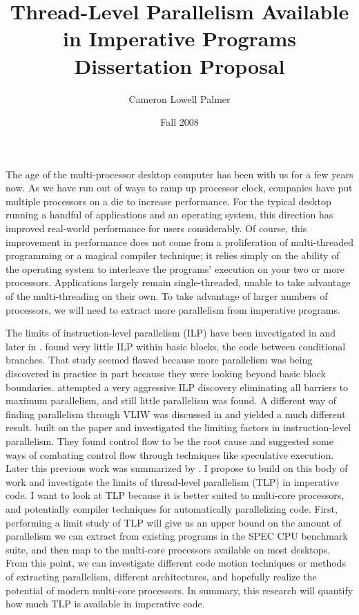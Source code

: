 \documentclass[12pt,twoside,letterpaper]{article}
\title{Thread-Level Parallelism Available in Imperative Programs Dissertation Proposal}
\author{Cameron Lowell Palmer}
\date{Fall 2008}
\begin{document}
\maketitle
The age of the multi-processor desktop computer has been with us for a few years now. As we have run out of ways to ramp up processor clock, companies have put multiple processors on a die to increase performance. For the typical desktop running a handful of applications and an operating system, this direction has improved real-world performance for users considerably. Of course, this improvement in performance does not come from a proliferation of multi-threaded programming or a magical compiler technique; it relies simply on the ability of the operating system to interleave the programs' execution on your two or more processors. Applications largely remain single-threaded, unable to take advantage of the multi-threading on their own. To take advantage of larger numbers of processors, we will need to extract more parallelism from imperative programs.

The limits of instruction-level parallelism (ILP) have been investigated in \cite{Tjaden:1970p214} and later in \cite{Wall:1991p191}. \cite{Tjaden:1970p214} found very little ILP within basic blocks, the code between conditional branches. That study seemed flawed because more parallelism was being discovered in practice in part because they were looking beyond basic block boundaries. \cite{Wall:1991p191} attempted a very aggressive ILP discovery eliminating all barriers to maximum parallelism, and still little parallelism was found. A different way of finding parallelism through VLIW was discussed in \cite{Nicolau:1984p217} and yielded a much different result. \cite{Lam:1992p188} built on the \cite{Wall:1991p191} paper and investigated the limiting factors in instruction-level parallelism. They found control flow to be the root cause and suggested some ways of combating control flow through techniques like speculative execution. Later this previous work was summarized by \cite{Rau:1992p211}. I propose to build on this body of work and investigate the limits of thread-level parallelism (TLP) in imperative code. I want to look at TLP because it is better suited to multi-core processors, and potentially compiler techniques for automatically parallelizing code. First, performing a limit study of TLP will give us an upper bound on the amount of parallelism we can extract from existing programs in the SPEC CPU benchmark suite, and then map to the multi-core processors available on most desktops. From this point, we can investigate different code motion techniques or methods of extracting parallelism, different architectures, and hopefully realize the potential of modern multi-core processors. In summary, this research will quantify how much TLP is available in imperative code.
\end{document}
